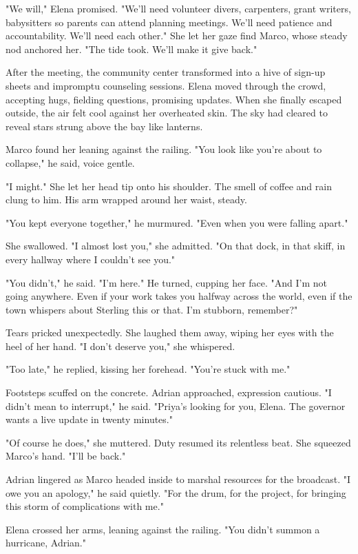 "We will," Elena promised. "We'll need volunteer divers, carpenters, grant writers, babysitters so parents can attend planning meetings. We'll need patience and accountability. We'll need each other." She let her gaze find Marco, whose steady nod anchored her. "The tide took. We'll make it give back."

After the meeting, the community center transformed into a hive of sign-up sheets and impromptu counseling sessions. Elena moved through the crowd, accepting hugs, fielding questions, promising updates. When she finally escaped outside, the air felt cool against her overheated skin. The sky had cleared to reveal stars strung above the bay like lanterns.

Marco found her leaning against the railing. "You look like you're about to collapse," he said, voice gentle.

"I might." She let her head tip onto his shoulder. The smell of coffee and rain clung to him. His arm wrapped around her waist, steady.

"You kept everyone together," he murmured. "Even when you were falling apart."

She swallowed. "I almost lost you," she admitted. "On that dock, in that skiff, in every hallway where I couldn't see you."

"You didn't," he said. "I'm here." He turned, cupping her face. "And I'm not going anywhere. Even if your work takes you halfway across the world, even if the town whispers about Sterling this or that. I'm stubborn, remember?"

Tears pricked unexpectedly. She laughed them away, wiping her eyes with the heel of her hand. "I don't deserve you," she whispered.

"Too late," he replied, kissing her forehead. "You're stuck with me."

Footsteps scuffed on the concrete. Adrian approached, expression cautious. "I didn't mean to interrupt," he said. "Priya's looking for you, Elena. The governor wants a live update in twenty minutes."

"Of course he does," she muttered. Duty resumed its relentless beat. She squeezed Marco's hand. "I'll be back."

Adrian lingered as Marco headed inside to marshal resources for the broadcast. "I owe you an apology," he said quietly. "For the drum, for the project, for bringing this storm of complications with me."

Elena crossed her arms, leaning against the railing. "You didn't summon a hurricane, Adrian."

